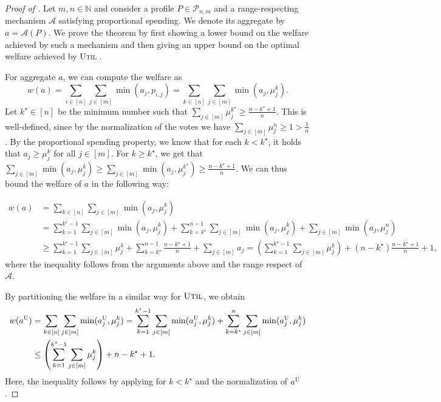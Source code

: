 \documentclass[11pt]{article}
\newcommand{\A}{\mathcal{A}}
\newcommand{\N}{\mathbb{N}}
\newcommand{\Ut}{\textsc{Util} }
\newcommand{\Uts}{\textsc{U} } %
\begin{document}
\begin{proof}[Proof of ]
    Let $m,n\in \N$ and consider a profile $P\in \mathcal{P}_{n,m}$ and a range-respecting mechanism $\A$ satisfying proportional spending.
    We denote its aggregate by~$a=\A(P)$.
    We prove the theorem by first showing a lower bound on the welfare achieved by such a mechanism and then giving an upper bound on the optimal welfare achieved by \Ut. 
    
    For aggregate $a$, we can compute the welfare as $$w(a) = \sum_{i \in [n]} \sum_{j \in [m]} \min(a_j, p_{i,j}) = \sum_{k \in [n]} \sum_{j \in [m]} \min(a_j, \mu^k_j).$$
    Let $k^\star\in [n]$ be the minimum number such that $\sum_{j \in [m]} \mu^{k^\star}_j \ge \frac{n-k^\star+1}{n}$. This is well-defined, since by the normalization of the votes we have $\sum_{j \in [m]} \mu^n_j \ge 1 > \frac{1}{n}$. By the proportional spending property, we know that for each $k < k^\star$, it holds that $a_j \ge \mu^k_j$ for all $j \in [m]$. For $k \ge k^\star$, we get that $\sum_{j\in [m]} \min(a_j, \mu^k_j) \ge \sum_{j\in [m]} \min(a_j, \mu^{k^\star}_j) \ge \frac{n-k^\star+1}{n}$. We can thus bound the welfare of $a$ in the following way:

    \begin{align*}
        w(a) &= \sum_{k \in [n]} \sum_{j \in [m]} \min(a_j, \mu^k_j) \\
        &= \sum_{k = 1}^{k^\star-1} \sum_{j \in [m]} \min(a_j, \mu^k_j) + \sum_{k = k^\star}^{n-1} \sum_{j \in [m]} \min(a_j, \mu^k_j) + \sum_{j \in [m]} \min(a_j, \mu^n_j) \\
        &\ge \sum_{k = 1}^{k^\star-1} \sum_{j \in [m]} \mu^k_j + \sum_{k = k^\star}^{n-1} \frac{n-k^\star+1}{n} + \sum_{j \in [m]} a_j  = \left(\sum_{k = 1}^{k^\star-1} \sum_{j \in [m]} \mu^k_j \right) + (n-k^\star) \frac{n-k^\star+1}{n} + 1,
    \end{align*}
    where the inequality follows from the arguments above and the range respect of $\A$.
    
    By partitioning the welfare in a similar way for $\Ut$, we obtain
    \begin{align*}
        w(a^\Uts) &= \sum_{k \in [n]} \sum_{j \in [m]} \min(a^\Uts_j, \mu^k_j) = \sum_{k = 1}^{k^\star-1} \sum_{j \in [m]} \min(a^\Uts_j, \mu^k_j) + \sum_{k = k^\star}^{n} \sum_{j \in [m]} \min(a^\Uts_j, \mu^k_j) \\
        & \le \left( \sum_{k = 1}^{k^\star-1} \sum_{j \in [m]} \mu^k_j \right) + n - k^\star + 1.
    \end{align*}
     Here, the inequality follows by applying  for $k < k^\star$ and the normalization of $a^\Uts$.
     

\end{proof}
\end{document}
